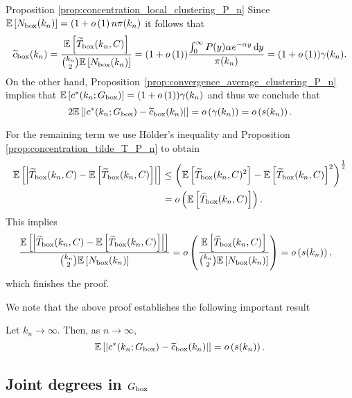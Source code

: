 \begin{proofof}{Proposition \ref{prop:concentration_local_clustering_P_n}}
Since $\mathbb{E}\left[N_{\text{box}}(k_n)\right] = (1+o\left(1\right)n {\pi}(k_n)$ it follows that
\[
	\widetilde{c}_{\text{box}}(k_n) = \frac{\mathbb{E}\left[\widetilde{T}_{\text{box}}(k_n,C)\right]}{\binom{k_n}{2}\mathbb{E}\left[N_{\text{box}}(k_n)\right]}
	= (1+o\left(1\right)) \frac{\int_0^\infty P(y) \alpha e^{-\alpha y} \operatorname{\mathrm{d}\hspace{-2pt}} y}{{\pi}(k_n)}
	= (1 + o\left(1\right)) \gamma(k_n).
\]
On the other hand, Proposition~\ref{prop:convergence_average_clustering_P_n} implies that $\mathbb{E}\left[c^\ast(k_n; G_{\mathrm{box}})\right] = (1+o\left(1\right))\gamma(k_n)$ and thus we conclude that
\[
	2\mathbb{E}\left[\left|c^\ast(k_n; G_{\mathrm{box}}) - \widetilde{c}_{\text{box}}(k_n)\right|\right]
	= o\left(\gamma(k_n)\right) = o\left(s(k_n)\right).	
\]

For the remaining term we use H\"{o}lder's inequality and Proposition \ref{prop:concentration_tilde_T_P_n} to obtain
\begin{align*}
	\mathbb{E}\left[\left|\widetilde{T}_{\text{box}}(k_n,C) - \mathbb{E}\left[\widetilde{T}_{\text{box}}(k_n,C)\right]\right|\right]
	&\le \left(\mathbb{E}\left[\widetilde{T}_{\text{box}}(k_n,C)^2\right] 
		- \mathbb{E}\left[\widetilde{T}_{\text{box}}(k_n,C)\right]^2\right)^{\frac{1}{2}}\\
	&= o\left(\mathbb{E}\left[\widetilde{T}_{\text{box}}(k_n,C)\right]\right).
\end{align*}
This implies
\begin{align*}
	\frac{\mathbb{E}\left[\left|\widetilde{T}_{\text{box}}(k_n,C) - \mathbb{E}\left[\widetilde{T}_{\text{box}}(k_n,C)\right]\right|\right]}
		{\binom{k_n}{2}\mathbb{E}\left[N_{\text{box}}(k_n)\right]}
	&= o\left(\frac{\mathbb{E}\left[\widetilde{T}_{\text{box}}(k_n,C)\right]}{\binom{k_n}{2}\mathbb{E}\left[N_{\text{box}}(k_n)\right]}\right)
	= o\left(s(k_n)\right),
\end{align*}
which finishes the proof.
\end{proofof}

We note that the above proof establishes the following important result

\begin{corollary}\label{cor:c_ast_box_2_tilde_c_box}
Let $k_n \to \infty$. Then, as $n \to \infty$,
\[
	\mathbb{E}\left[\left|c^\ast(k_n; G_{\mathrm{box}}) - \widetilde{c}_{\mathrm{box}}(k_n)\right|\right] = o\left(s(k_n)\right).
\]
\end{corollary}

\subsection{Joint degrees in $G_{\mathrm{box}}$}


